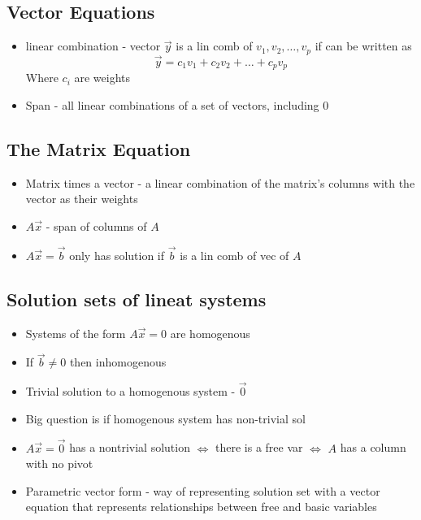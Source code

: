 \documentclass{article}
\begin{document}
\subsection{Vector Equations}
\begin{itemize}
    \item linear combination - vector \(\vec{y}\) is a lin comb of \(v_1,v_2,\dots , v_p\) if can be written as 
    \[\vec{y}=c_1v_1+c_2v_2+\dots+c_pv_p\] Where \(c_i\) are weights
    \item Span - all linear combinations of a set of vectors, including 0
\end{itemize}

\subsection{The Matrix Equation}
\begin{itemize}
    \item Matrix times a vector - a linear combination of the matrix's columns with the vector as their weights
    \item \(A\vec{x}\) - span of columns of \(A\)
    \item \(A\vec{x}=\vec{b}\) only has solution if \(\vec{b}\) is a lin comb of vec of \(A\)
\end{itemize}

\subsection{Solution sets of lineat systems}
\begin{itemize}
    \item Systems of the form \(A\vec{x}=0\) are homogenous
    \item If \(\vec{b}\neq 0\) then inhomogenous
    \item Trivial solution to a homogenous system - \(\vec{0}\)
    \item Big question is if homogenous system has non-trivial sol 
    \item \(A\vec{x}=\vec{0}\) has a nontrivial solution \(\Leftrightarrow\) there is a free var \(\Leftrightarrow\) \(A\) has a column with no pivot
    \item Parametric vector form - way of representing solution set with a vector equation that represents relationships between free and basic variables 
\end{itemize}
\end{document}
